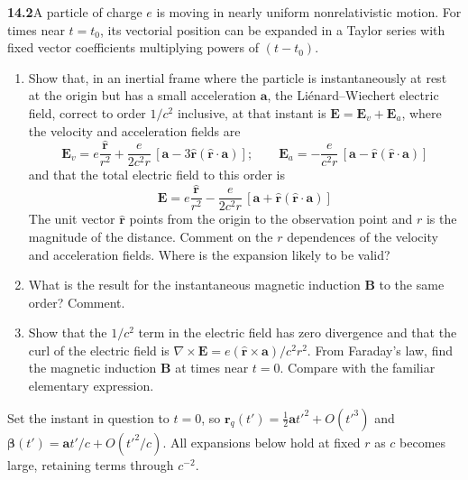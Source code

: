 \par\bigskip
\noindent\textbf{14.2}\quad A particle of charge $e$ is moving in nearly uniform nonrelativistic motion. For times near $t=t_{0}$, its vectorial position can be expanded in a Taylor series with fixed vector coefficients multiplying powers of $(t-t_{0})$.
\begin{enumerate}
\item[(a)] Show that, in an inertial frame where the particle is instantaneously at rest at the origin but has a small acceleration $\mathbf{a}$, the Li\'enard--Wiechert electric field, correct to order $1/c^{2}$ inclusive, at that instant is $\mathbf{E}=\mathbf{E}_{v}+\mathbf{E}_{a}$, where the velocity and acceleration fields are
\[
\mathbf{E}_{v}=e\frac{\hat{\mathbf{r}}}{r^{2}}+\frac{e}{2c^{2}r}\,[\mathbf{a}-3\hat{\mathbf{r}}(\hat{\mathbf{r}}\cdot\mathbf{a})];\qquad
\mathbf{E}_{a}=-\frac{e}{c^{2}r}\,[\mathbf{a}-\hat{\mathbf{r}}(\hat{\mathbf{r}}\cdot\mathbf{a})]
\]
and that the total electric field to this order is
\[
\mathbf{E}=e\frac{\hat{\mathbf{r}}}{r^{2}}-\frac{e}{2c^{2}r}\,[\mathbf{a}+\hat{\mathbf{r}}(\hat{\mathbf{r}}\cdot\mathbf{a})]
\]
The unit vector $\hat{\mathbf{r}}$ points from the origin to the observation point and $r$ is the magnitude of the distance. Comment on the $r$ dependences of the velocity and acceleration fields. Where is the expansion likely to be valid?
\item[(b)] What is the result for the instantaneous magnetic induction $\mathbf{B}$ to the same order? Comment.
\item[(c)] Show that the $1/c^{2}$ term in the electric field has zero divergence and that the curl of the electric field is $\nabla\times\mathbf{E}=e(\hat{\mathbf{r}}\times\mathbf{a})/c^{2}r^{2}$. From Faraday's law, find the magnetic induction $\mathbf{B}$ at times near $t=0$. Compare with the familiar elementary expression.
\end{enumerate}
\solution

Set the instant in question to $t=0$, so
$\mathbf r_q(t')=\tfrac12\mathbf a t'^2+O(t'^3)$ and
$\boldsymbol\beta(t')=\mathbf a t'/c+O(t'^2/c)$.
All expansions below hold at fixed $r$ as $c$ becomes large, retaining
terms through $c^{-2}$.

